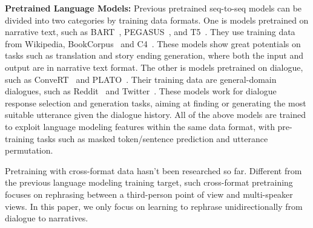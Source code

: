 \textbf{Pretrained Language Models:} Previous pretrained seq-to-seq models can be divided into two categories by training data formats.
One is models pretrained on narrative text, such as BART~\cite{lewis2020bart}, PEGASUS~\cite{zhang2020pegasus}, and T5~\cite{raffel2020exploring}. They use training data from Wikipedia, BookCorpus~\cite{zhu2015aligning} and C4~\cite{raffel2020exploring}. These models show great potentials on tasks such as translation and story ending generation, where both the input and output are in narrative text format.
The other is models pretrained on dialogue, such as ConveRT~\cite{henderson2020convert} and PLATO~\cite{bao2020plato}. Their training data are general-domain dialogues, such as Reddit~\cite{henderson2019repository} and Twitter~\cite{cho2014learning}. These models work for dialogue response selection and generation tasks, aiming at finding or generating the most suitable utterance given the dialogue history.
All of the above models are trained to exploit language modeling features within the same data format, with pre-training tasks such as masked token/sentence prediction and utterance permutation.

Pretraining with cross-format data hasn't been researched so far. 
Different from the previous language modeling training target, 
such cross-format pretraining focuses on rephrasing between a third-person point of view and multi-speaker views.
In this paper, we only focus on learning to rephrase unidirectionally from  dialogue to narratives.




